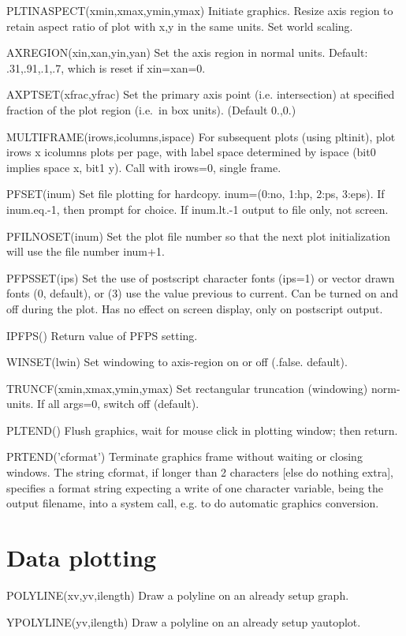\documentclass[12pt]{article}
\begin{document}
PLTINASPECT(xmin,xmax,ymin,ymax) Initiate graphics. Resize axis region
to retain aspect ratio of plot with x,y in the same units. Set world scaling.

AXREGION(xin,xan,yin,yan) Set the axis region in normal units.
Default: .31,.91,.1,.7, which is reset if xin=xan=0.

AXPTSET(xfrac,yfrac) Set the primary axis point (i.e. intersection) at
specified fraction of the plot region (i.e.\ in box units). (Default
0.,0.)

MULTIFRAME(irows,icolumns,ispace) For subsequent plots (using pltinit),
plot irows x icolumns plots per page, with label space determined by
ispace (bit0 implies space x, bit1 y). Call with irows=0, single frame.

PFSET(inum) Set file plotting for hardcopy. inum=(0:no, 1:hp, 2:ps, 3:eps).
If inum.eq.-1, then prompt for choice. If inum.lt.-1 output to file
only, not screen.

PFILNOSET(inum) Set the plot file number so that the next plot
initialization will use the file number inum+1.

PFPSSET(ips) Set the use of postscript character fonts (ips=1) or vector
drawn fonts (0, default), or (3) use the value previous to current.
Can be turned on and off during the plot. Has no effect on screen
display, only on postscript output.

IPFPS() Return value of PFPS setting.

WINSET(lwin) Set windowing to axis-region on or off (.false. default).

TRUNCF(xmin,xmax,ymin,ymax) Set rectangular truncation (windowing) norm-units.
If all args=0, switch off (default).

PLTEND() Flush graphics, wait for mouse click in plotting window; then
return.

PRTEND('cformat') Terminate graphics frame without waiting or closing
windows. The string cformat, if longer than 2 characters [else do
nothing extra], specifies a format string expecting a write of one
character variable, being the output filename, into a system call,
e.g. to do automatic graphics conversion.

\section{Data plotting}

POLYLINE(xv,yv,ilength) Draw a polyline on an already setup graph.

YPOLYLINE(yv,ilength) Draw a polyline on an already setup yautoplot.
\end{document}

